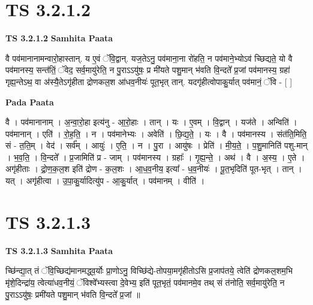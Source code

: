 \documentclass[17pt]{extarticle}
\begin{document}
\section{ TS 3.2.1.2 }

\textbf{TS 3.2.1.2 } \newline
\textbf{Samhita Paata} \newline

वै पव॑मानानामन्वारो॒हास्तान्. य ए॒वं ॅवि॒द्वान्. यज॒तेऽनु॒ पव॑माना॒ना रो॑हति॒ न पव॑माने॒भ्योऽव॑ च्छिद्यते॒ यो वै पव॑मानस्य॒ सन्त॑तिं॒ ॅवेद॒ सर्व॒मायु॑रेति॒ न पु॒राऽऽयु॑षः॒ प्र मी॑यते पशु॒मान् भ॑वति वि॒न्दते᳚ प्र॒जां पव॑मानस्य॒ ग्रहा॑ गृह्य॒न्तेऽथ॒ वा अ॑स्यै॒तेऽगृ॑हीता द्रोणकल॒श आ॑धव॒नीयः॑ पूत॒भृत् तान्. यदगृ॑हीत्वोपाकु॒र्यात् पव॑मानं॒ ॅवि - [  ] \newline

\textbf{Pada Paata} \newline

वै । पव॑मानानाम् । अ॒न्वा॒रो॒हा इत्य॑नु - आ॒रो॒हाः । तान् । यः । ए॒वम् । वि॒द्वान् । यज॑ते । अन्विति॑ । पव॑मानान् । एति॑ । रो॒ह॒ति॒ । न । पव॑मानेभ्यः । अवेति॑ । छि॒द्य॒ते॒ । यः । वै । पव॑मानस्य । संत॑ति॒मिति॒ सं - त॒ति॒म् । वेद॑ । सर्व᳚म् । आयुः॑ । ए॒ति॒ । न । पु॒रा । आयु॑षः । प्रेति॑ । मी॒य॒ते॒ । प॒शु॒मानिति॑ पशु-मान् । भ॒व॒ति॒ । वि॒न्दते᳚ । प्र॒जामिति॑ प्र - जाम् । पव॑मानस्य । ग्रहाः᳚ । गृ॒ह्य॒न्ते॒ । अथ॑ । वै । अ॒स्य॒ । ए॒ते । अगृ॑हीताः । द्रो॒ण॒क॒ल॒श इति॑ द्रोण - क॒ल॒शः । आ॒ध॒व॒नीय॒ इत्या᳚ - ध॒व॒नीयः॑ । पू॒त॒भृदिति॑ पूत-भृत् । तान् । यत् । अगृ॑हीत्वा । उ॒पा॒कु॒र्यादित्यु॑प - आ॒कु॒र्यात् । पव॑मानम् । वीति॑ ।  \newline





\section{ TS 3.2.1.3 }

\textbf{TS 3.2.1.3 } \newline
\textbf{Samhita Paata} \newline

च्छि॑न्द्या॒त् तं ॅवि॒च्छिद्य॑मानमद्ध्व॒र्योः प्रा॒णोऽनु॒ विच्छि॑द्ये-तोपया॒मगृ॑हीतोऽसि प्र॒जाप॑तये॒ त्वेति॑ द्रोणकल॒शम॒भि मृ॑शे॒दिन्द्रा॑य॒ त्वेत्या॑धव॒नीयं॒ ॅविश्वे᳚भ्यस्त्वा दे॒वेभ्य॒ इति॑ पूत॒भृतं॒ पव॑मानमे॒व तथ् सं त॑नोति॒ सर्व॒मायु॑रेति॒ न पु॒राऽऽयु॑षः॒ प्रमी॑यते पशु॒मान् भ॑वति वि॒न्दते᳚ प्र॒जां ॥ \newline
\end{document}

